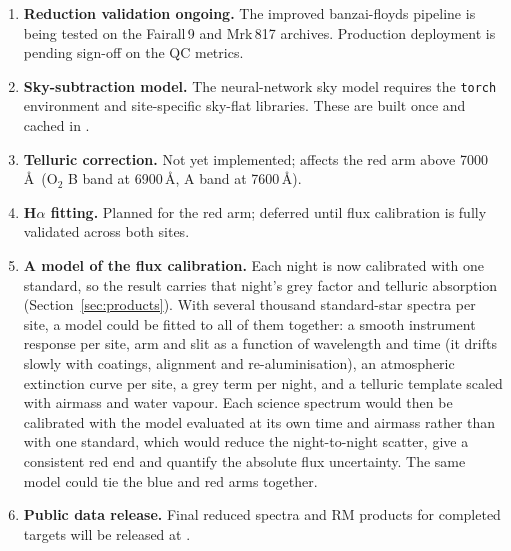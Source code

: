 \documentclass[a4paper,12pt]{article}
\begin{document}
\begin{enumerate}
  \item \textbf{Reduction validation ongoing.}  The improved banzai-floyds
        pipeline is being tested on the Fairall\,9 and Mrk\,817 archives.
        Production deployment is pending sign-off on the QC metrics.
  \item \textbf{Sky-subtraction model.}  The neural-network sky model requires
        the \texttt{torch} environment and site-specific sky-flat libraries.
        These are built once and cached in .
  \item \textbf{Telluric correction.}  Not yet implemented; affects the red arm
        above 7000\,\AA\ (O$_2$ B band at 6900\,\AA, A band at 7600\,\AA).
  \item \textbf{H$\alpha$ fitting.}  Planned for the red arm; deferred until
        flux calibration is fully validated across both sites.
  \item \textbf{A model of the flux calibration.}  Each night is now calibrated
        with one standard, so the result carries that night's grey factor and
        telluric absorption (Section~\ref{sec:products}).  With several thousand
        standard-star spectra per site, a model could be fitted to all of them
        together: a smooth instrument response per site, arm and slit as a function of
        wavelength and time (it drifts slowly with coatings, alignment and
        re-aluminisation), an atmospheric extinction curve per site, a grey term per
        night, and a telluric template scaled with airmass and water vapour.  Each
        science spectrum would then be calibrated with the model evaluated at its own
        time and airmass rather than with one standard, which would reduce the
        night-to-night scatter, give a consistent red end and quantify the absolute
        flux uncertainty.  The same model could tie the blue and red arms together.
  \item \textbf{Public data release.}  Final reduced spectra and RM products
        for completed targets will be released at
        .
\end{enumerate}
\end{document}
